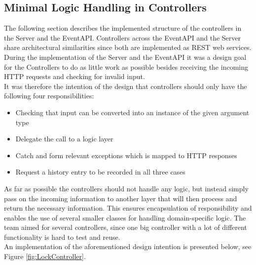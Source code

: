 \subsection{Minimal Logic Handling in Controllers}
The following section describes the implemented structure of the controllers in the Server and the EventAPI. Controllers across the EventAPI and the Server share architectural similarities since both are implemented as REST web services. \\

During the implementation of the Server and the EventAPI it was a design goal for the Controllers to do as little work as possible besides receiving the incoming HTTP requests and checking for invalid input. \\ 

It was therefore the intention of the design that controllers should only have the following four responsibilities:
\begin{itemize}
\item Checking that input can be converted into an instance of the given argument type
\item Delegate the call to a logic layer
\item Catch and form relevant exceptions which is mapped to HTTP responses
\item Request a history entry to be recorded in all three cases
\end{itemize}

As far as possible the controllers should not handle any logic, but instead simply pass on the incoming information to another layer that will then process and return the necessary information. This ensures encapsulation of responsibility and enables the use of several smaller classes for handling domain-specific logic. The team aimed for several controllers, since one big controller with a lot of different functionality is hard to test and reuse.\\

An implementation of the aforementioned design intention is presented below, see Figure \ref{fig:LockController}.

